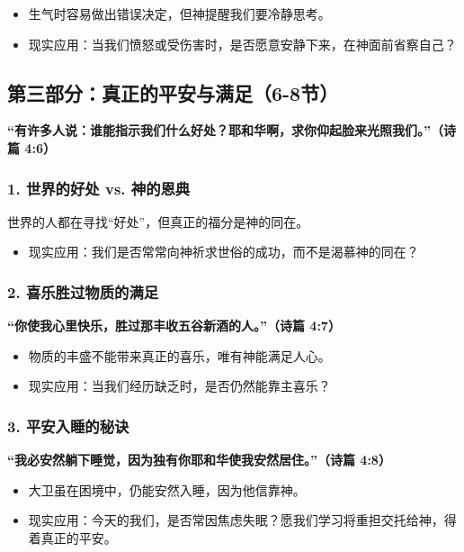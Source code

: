 \documentclass[a4paper, 12pt]{article}
\begin{document}
\begin{itemize}
    \item 生气时容易做出错误决定，但神提醒我们要冷静思考。
    \item 现实应用：当我们愤怒或受伤害时，是否愿意安静下来，在神面前省察自己？
\end{itemize}

\subsection*{第三部分：真正的平安与满足（6-8节）}

\textbf{“有许多人说：谁能指示我们什么好处？耶和华啊，求你仰起脸来光照我们。”（诗篇 4:6）}

\subsubsection*{1. 世界的好处 vs. 神的恩典}
世界的人都在寻找“好处”，但真正的福分是神的同在。
\begin{itemize}
    \item 现实应用：我们是否常常向神祈求世俗的成功，而不是渴慕神的同在？
\end{itemize}

\subsubsection*{2. 喜乐胜过物质的满足}
\textbf{“你使我心里快乐，胜过那丰收五谷新酒的人。”（诗篇 4:7）}

\begin{itemize}
    \item 物质的丰盛不能带来真正的喜乐，唯有神能满足人心。
    \item 现实应用：当我们经历缺乏时，是否仍然能靠主喜乐？
\end{itemize}

\subsubsection*{3. 平安入睡的秘诀}
\textbf{“我必安然躺下睡觉，因为独有你耶和华使我安然居住。”（诗篇 4:8）}

\begin{itemize}
    \item 大卫虽在困境中，仍能安然入睡，因为他信靠神。
    \item 现实应用：今天的我们，是否常因焦虑失眠？愿我们学习将重担交托给神，得着真正的平安。
\end{itemize}
\end{document}
